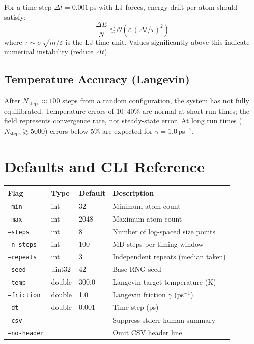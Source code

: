 \documentclass[11pt,a4paper]{article}
\theoremstyle{definition}
\theoremstyle{plain}
\newcommand{\dt}{\Delta t}
\begin{document}
For a time-step $\dt = 0.001$\,ps with LJ forces, energy drift per atom
should satisfy:
\begin{equation}
  \frac{\Delta E}{N} \lesssim \mathcal{O}\!\left(\varepsilon\,(\dt/\tau)^2\right)
\end{equation}
where $\tau \sim \sigma\,\sqrt{m/\varepsilon}$ is the LJ time unit.  Values
significantly above this indicate numerical instability (reduce $\dt$).

\subsection{Temperature Accuracy (Langevin)}

After $N_{\mathrm{steps}} \approx 100$ steps from a random configuration,
the system has not fully equilibrated.  Temperature errors of 10–40\% are
normal at short run times; the field represents convergence rate, not
steady-state error.  At long run times ($N_{\mathrm{steps}} \gtrsim 5000$)
errors below 5\% are expected for $\gamma = 1.0$\,ps$^{-1}$.

\section{Defaults and CLI Reference}
\label{sec:cli}

\begin{center}
\begin{tabular}{llll}
\toprule
Flag & Type & Default & Description \\
\midrule
\texttt{--min}      & int    & 32    & Minimum atom count \\
\texttt{--max}      & int    & 2048  & Maximum atom count \\
\texttt{--steps}    & int    & 8     & Number of log-spaced size points \\
\texttt{--n\_steps} & int    & 100   & MD steps per timing window \\
\texttt{--repeats}  & int    & 3     & Independent repeats (median taken) \\
\texttt{--seed}     & uint32 & 42    & Base RNG seed \\
\texttt{--temp}     & double & 300.0 & Langevin target temperature (K) \\
\texttt{--friction} & double & 1.0   & Langevin friction $\gamma$ (ps$^{-1}$) \\
\texttt{--dt}       & double & 0.001 & Time-step (ps) \\
\texttt{--csv}      &        &       & Suppress stderr human summary \\
\texttt{--no-header}&        &       & Omit CSV header line \\
\bottomrule
\end{tabular}
\end{center}
\end{document}
